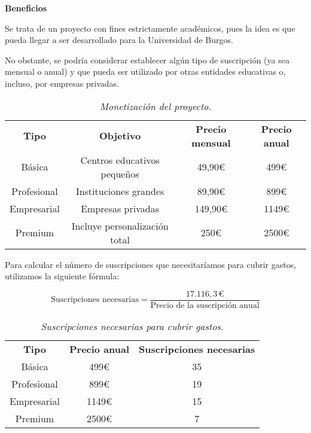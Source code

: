 \textbf{Beneficios}

Se trata de un proyecto con fines estrictamente académicos, pues la idea es que pueda llegar a ser desarrollado para
la Universidad de Burgos.

No obstante, se podría considerar establecer algún tipo de suscripción (ya sea mensual o anual) y que pueda ser
utilizado por otras entidades educativas o, incluso, por empresas privadas.

\begin{table}[H]
    \centering
    \begin{tabular}{| c | c | c | c | }\hline
        \Xhline{2\arrayrulewidth}
        \textbf{Tipo} & \textbf{Objetivo} & \textbf{Precio mensual} & \textbf{Precio anual} \\ \Xhline{2\arrayrulewidth}
        Básica & Centros educativos pequeños & 49,90€ & 499€ \\ \hline
        Profesional & Instituciones grandes & 89,90€ & 899€ \\ \hline
        Empresarial & Empresas privadas & 149,90€ & 1149€ \\ \hline
        Premium & Incluye personalización total & 250€ & 2500€ \\ \hline
    \end{tabular}
    \caption{\textit{Monetización del proyecto.}}
\end{table}

Para calcular el número de suscripciones que necesitaríamos para cubrir gastos, utilizamos la siguiente fórmula:

\[
    \text{Suscripciones necesarias} = \frac{17.116{,}3\,€}{\text{Precio de la suscripción anual}}
\]

\begin{table}[H]
    \centering
    \begin{tabular}{| c | c | c | }\hline
        \Xhline{2\arrayrulewidth}
        \textbf{Tipo} & \textbf{Precio anual} & \textbf{Suscripciones necesarias} \\ \Xhline{2\arrayrulewidth}
        Básica & 499€ & 35 \\ \hline
        Profesional & 899€ & 19 \\ \hline
        Empresarial & 1149€ & 15 \\ \hline
        Premium & 2500€ & 7 \\ \hline
    \end{tabular}
    \caption{\textit{Suscripciones necesarias para cubrir gastos.}}
\end{table}

